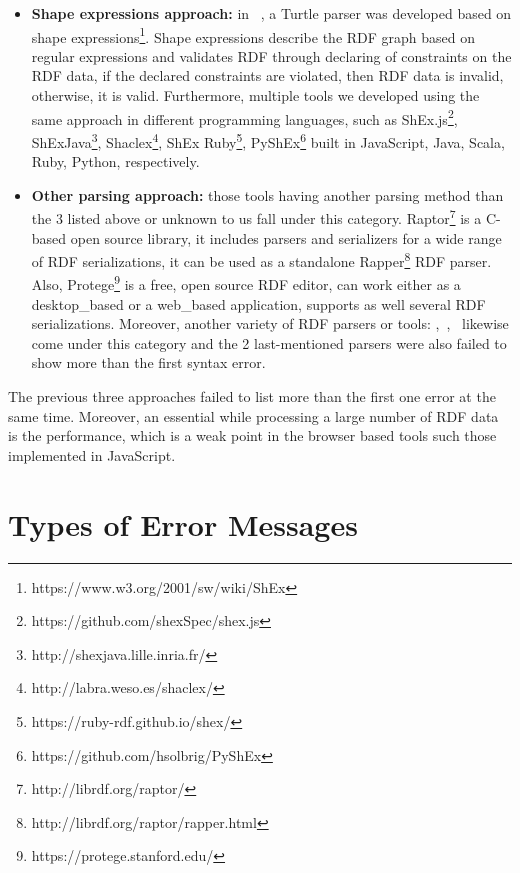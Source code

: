\begin{itemize}[noitemsep]
\item \textbf{Shape expressions approach:} in ~\cite{prud2014shape}, a Turtle parser was developed based on shape expressions\footnote{https://www.w3.org/2001/sw/wiki/ShEx}. 
Shape expressions describe the RDF graph based on regular expressions and validates RDF through declaring of constraints on the RDF data, if the declared constraints are violated, then RDF data is invalid, otherwise, it is valid. Furthermore, multiple tools we developed using the same approach in different programming languages, such as ShEx.js\footnote{https://github.com/shexSpec/shex.js}, ShExJava\footnote{http://shexjava.lille.inria.fr/}, Shaclex\footnote{http://labra.weso.es/shaclex/}, ShEx Ruby\footnote{https://ruby-rdf.github.io/shex/}, PyShEx\footnote{https://github.com/hsolbrig/PyShEx} built in JavaScript, Java, Scala, Ruby, Python, respectively.
\item \textbf{Other parsing approach:} those tools having another parsing method than the 3 listed above or unknown to us fall under this category. Raptor\footnote{http://librdf.org/raptor/} is a C-based open source library, it includes parsers and serializers for a wide range of RDF serializations, it can be used as a standalone Rapper\footnote{http://librdf.org/raptor/rapper.html} RDF parser. Also, Protege\footnote{https://protege.stanford.edu/} is a free, open source RDF editor, can work either as a desktop\_based or a web\_based application, supports as well several RDF serializations. Moreover, another variety of RDF parsers or tools: \cite{humfrey2010easyrdf},~\cite{RDF4J:Online},~\cite{krech2002rdflib} likewise come
under  this category and the 2 last-mentioned parsers were also failed to show more than the first syntax error.            
\end{itemize} 
\vspace*{-5mm}

The previous three approaches failed to list more than the first one error at the same time. 
Moreover, an essential while processing a large number of RDF data is the performance, which is a weak point in the browser based tools such those implemented in JavaScript.

\section{Types of Error Messages}


